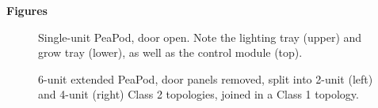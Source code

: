 \clearpage

\textbf{Figures}

\begin{figure}[h!]
    \centering
    \caption{Single-unit PeaPod, door open. Note the lighting tray (upper) and grow tray (lower), as well as the control module (top).}
    \label{fig:housing_single}
\end{figure}

\begin{figure}[h!]
    \centering
    \caption{6-unit extended PeaPod, door panels removed, split into 2-unit (left) and 4-unit (right) Class 2 topologies, joined in a Class 1 topology.}
    \label{fig:housing_extended}
\end{figure}